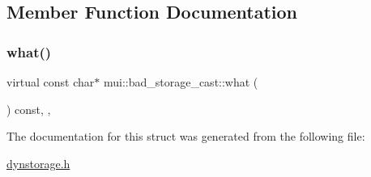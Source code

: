 \subsection{Member Function Documentation}
\mbox{\label{structmui_1_1bad__storage__cast_a052cbf41469ca194b4f423ea523f0071}} 
\subsubsection{\texorpdfstring{what()}{what()}}
{\footnotesize\ttfamily virtual const char$\ast$ mui\+::bad\+\_\+storage\+\_\+cast\+::what (\begin{DoxyParamCaption}{ }\end{DoxyParamCaption}) const\hspace{0.3cm}{\ttfamily [inline]}, {\ttfamily [virtual]}, {\ttfamily [noexcept]}}



The documentation for this struct was generated from the following file\+:\begin{DoxyCompactItemize}
\item 
\hyperlink{dynstorage_8h}{dynstorage.\+h}\end{DoxyCompactItemize}
